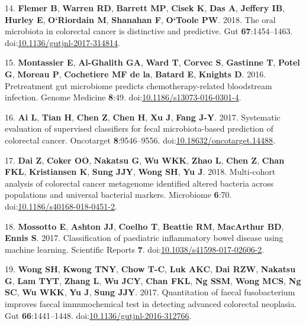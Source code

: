 \documentclass[11pt,]{article}
\begin{document}
\hypertarget{ref-flemer_oral_2018}{}
14. \textbf{Flemer B}, \textbf{Warren RD}, \textbf{Barrett MP},
\textbf{Cisek K}, \textbf{Das A}, \textbf{Jeffery IB}, \textbf{Hurley
E}, \textbf{O`Riordain M}, \textbf{Shanahan F}, \textbf{O`Toole PW}.
2018. The oral microbiota in colorectal cancer is distinctive and
predictive. Gut \textbf{67}:1454--1463.
doi:\href{https://doi.org/10.1136/gutjnl-2017-314814}{10.1136/gutjnl-2017-314814}.

\hypertarget{ref-montassier_pretreatment_2016}{}
15. \textbf{Montassier E}, \textbf{Al-Ghalith GA}, \textbf{Ward T},
\textbf{Corvec S}, \textbf{Gastinne T}, \textbf{Potel G}, \textbf{Moreau
P}, \textbf{Cochetiere MF de la}, \textbf{Batard E}, \textbf{Knights D}.
2016. Pretreatment gut microbiome predicts chemotherapy-related
bloodstream infection. Genome Medicine \textbf{8}:49.
doi:\href{https://doi.org/10.1186/s13073-016-0301-4}{10.1186/s13073-016-0301-4}.

\hypertarget{ref-ai_systematic_2017}{}
16. \textbf{Ai L}, \textbf{Tian H}, \textbf{Chen Z}, \textbf{Chen H},
\textbf{Xu J}, \textbf{Fang J-Y}. 2017. Systematic evaluation of
supervised classifiers for fecal microbiota-based prediction of
colorectal cancer. Oncotarget \textbf{8}:9546--9556.
doi:\href{https://doi.org/10.18632/oncotarget.14488}{10.18632/oncotarget.14488}.

\hypertarget{ref-dai_multi-cohort_2018}{}
17. \textbf{Dai Z}, \textbf{Coker OO}, \textbf{Nakatsu G}, \textbf{Wu
WKK}, \textbf{Zhao L}, \textbf{Chen Z}, \textbf{Chan FKL},
\textbf{Kristiansen K}, \textbf{Sung JJY}, \textbf{Wong SH}, \textbf{Yu
J}. 2018. Multi-cohort analysis of colorectal cancer metagenome
identified altered bacteria across populations and universal bacterial
markers. Microbiome \textbf{6}:70.
doi:\href{https://doi.org/10.1186/s40168-018-0451-2}{10.1186/s40168-018-0451-2}.

\hypertarget{ref-mossotto_classification_2017}{}
18. \textbf{Mossotto E}, \textbf{Ashton JJ}, \textbf{Coelho T},
\textbf{Beattie RM}, \textbf{MacArthur BD}, \textbf{Ennis S}. 2017.
Classification of paediatric inflammatory bowel disease using machine
learning. Scientific Reports \textbf{7}.
doi:\href{https://doi.org/10.1038/s41598-017-02606-2}{10.1038/s41598-017-02606-2}.

\hypertarget{ref-wong_quantitation_2017}{}
19. \textbf{Wong SH}, \textbf{Kwong TNY}, \textbf{Chow T-C}, \textbf{Luk
AKC}, \textbf{Dai RZW}, \textbf{Nakatsu G}, \textbf{Lam TYT},
\textbf{Zhang L}, \textbf{Wu JCY}, \textbf{Chan FKL}, \textbf{Ng SSM},
\textbf{Wong MCS}, \textbf{Ng SC}, \textbf{Wu WKK}, \textbf{Yu J},
\textbf{Sung JJY}. 2017. Quantitation of faecal fusobacterium improves
faecal immunochemical test in detecting advanced colorectal neoplasia.
Gut \textbf{66}:1441--1448.
doi:\href{https://doi.org/10.1136/gutjnl-2016-312766}{10.1136/gutjnl-2016-312766}.
\end{document}
